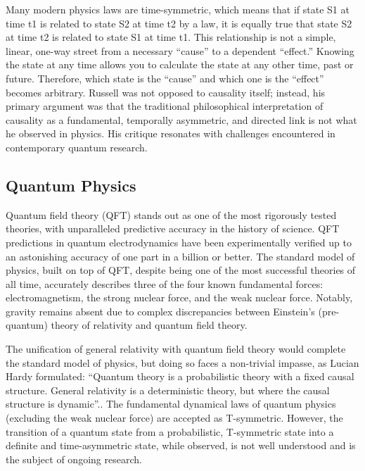 Many modern physics laws are time-symmetric, which means that if state S1 at time t1 is related to state S2 at time t2 by a law, it is equally true that state S2 at time t2 is related to state S1 at time t1. This relationship is not a simple, linear, one-way street from a necessary ``cause'' to a dependent ``effect.'' Knowing the state at any time allows you to calculate the state at any other time, past or future. Therefore, which state is the ``cause'' and which one is the ``effect'' becomes arbitrary. Russell was not opposed to causality itself; instead, his primary argument was that the traditional philosophical interpretation of causality as a fundamental, temporally asymmetric, and directed link is not what he observed in physics. His critique resonates with challenges encountered in contemporary quantum research.

\subsection{Quantum Physics}
\label{sec:history_quantum}

Quantum field theory\cite{peskin2018introduction} (QFT) stands out as one of the most rigorously tested theories, with unparalleled predictive accuracy in the history of science. QFT predictions in quantum electrodynamics have been experimentally verified up to an astonishing accuracy of one part in a billion or better. The standard model of physics, built on top of QFT, despite being one of the most successful theories of all time, accurately describes three of the four known fundamental forces: electromagnetism, the strong nuclear force, and the weak nuclear force. Notably, gravity remains absent due to complex discrepancies between Einstein’s (pre-quantum) theory of relativity and quantum field theory.

The unification of general relativity with quantum field theory would complete the standard model of physics, but doing so faces a non-trivial impasse, as Lucian Hardy formulated: ``Quantum theory is a probabilistic theory with a fixed causal structure. General relativity is a deterministic theory, but where the causal structure is dynamic''\cite{HardyDynamicCausalStructure}.. The fundamental dynamical laws of quantum physics (excluding the weak nuclear force) are accepted as T-symmetric. However, the transition of a quantum state from a probabilistic, T-symmetric state into a definite and time-asymmetric state, while observed, is not well understood and is the subject of ongoing research.

